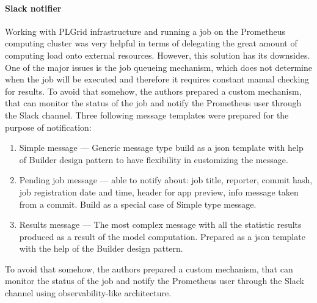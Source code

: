 \paragraph{Slack notifier}\label{para:slack-notifier}
Working with PLGrid infrastructure and running a job on the Prometheus computing cluster was very helpful in terms of delegating the great amount of computing load onto external resources.
However, this solution has its downsides.
One of the major issues is the job queueing mechanism, which does not determine when the job will be executed and therefore it requires constant manual checking for results.
To avoid that somehow, the authors prepared a custom mechanism, that can monitor the status of the job and notify the Prometheus user through the Slack channel.
Three following message templates were prepared for the purpose of notification:
\begin{enumerate}
    \item Simple message --- Generic message type build as a \gls{json} template with help of Builder design pattern to have flexibility in customizing the message.
    \item Pending job message --- able to notify about: job title, reporter, commit hash, job registration date and time, header for app preview, info message taken from a commit.
    Build as a special case of Simple type message.
    \item Results message --- The most complex message with all the statistic results produced as a result of the model computation.
    Prepared as a \gls{json} template with the help of the Builder design pattern.
\end{enumerate}

To avoid that somehow, the authors prepared a custom mechanism, that can monitor the status of the job and notify the Prometheus user through the Slack channel using observability-like architecture.
